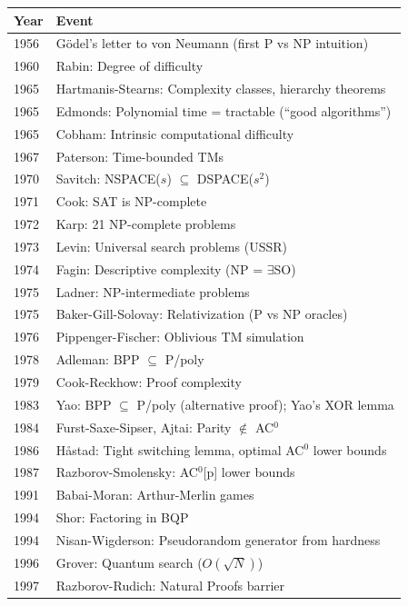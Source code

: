 \begin{tabularx}{\linewidth}{|l|X|}
\hline
\textbf{Year} & \textbf{Event} \\ \hline
1956 & G\"odel's letter to von Neumann (first P vs NP intuition) \\ \hline
1960 & Rabin: Degree of difficulty \\ \hline
1965 & Hartmanis-Stearns: Complexity classes, hierarchy theorems \\ \hline
1965 & Edmonds: Polynomial time = tractable (``good algorithms'') \\
 \hline
1965 & Cobham: Intrinsic computational difficulty \\
 \hline
1967 & Paterson: Time-bounded TMs \\
 \hline
1970 & Savitch: NSPACE($s$) $\subseteq$ DSPACE($s^2$) \\
 \hline
1971 & Cook: SAT is NP-complete \\
 \hline
1972 & Karp: 21 NP-complete problems \\
 \hline
1973 & Levin: Universal search problems (USSR) \\
 \hline
1974 & Fagin: Descriptive complexity (NP = $\exists$SO) \\
 \hline
1975 & Ladner: NP-intermediate problems \\
 \hline
1975 & Baker-Gill-Solovay: Relativization (P vs NP oracles) \\
 \hline
1976 & Pippenger-Fischer: Oblivious TM simulation \\
 \hline
1978 & Adleman: BPP $\subseteq$ P/poly \\
 \hline
1979 & Cook-Reckhow: Proof complexity \\
 \hline
1983 & Yao: BPP $\subseteq$ P/poly (alternative proof); Yao's XOR lemma \\
 \hline
1984 & Furst-Saxe-Sipser, Ajtai: Parity $\notin$ AC$^0$ \\
 \hline
1986 & H{\aa}stad: Tight switching lemma, optimal AC$^0$ lower bounds \\
 \hline
1987 & Razborov-Smolensky: AC$^0$[p] lower bounds \\
 \hline
1991 & Babai-Moran: Arthur-Merlin games \\
 \hline
1994 & Shor: Factoring in BQP \\
 \hline
1994 & Nisan-Wigderson: Pseudorandom generator from hardness \\
 \hline
1996 & Grover: Quantum search ($O(\sqrt{N})$) \\
 \hline
1997 & Razborov-Rudich: Natural Proofs barrier \\

\end{tabularx}
